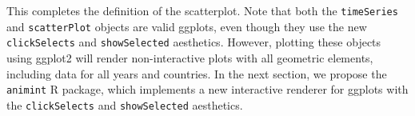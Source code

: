 \documentclass[12pt]{article}\usepackage[]{graphicx}\usepackage[]{color}
\begin{document}
This completes the definition of the scatterplot. Note that both the
\texttt{timeSeries} and \texttt{scatterPlot} objects are valid
ggplots, even though they use the new \texttt{clickSelects} and
\texttt{showSelected} aesthetics. However, plotting these objects
using ggplot2 will render non-interactive plots with all geometric
elements, including data for all years and countries. In the next
section, we propose the \texttt{animint} R package, which implements a new
interactive renderer for ggplots with the \texttt{clickSelects} and
\texttt{showSelected} aesthetics.

\end{document}
